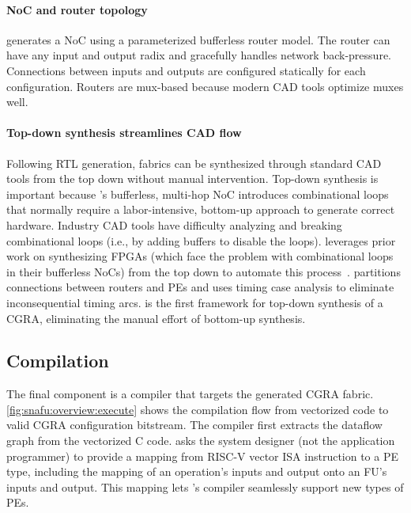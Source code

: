 \paragraph{NoC and router topology}
%
\snafuframe generates a NoC using a parameterized bufferless router model.
% 
The router can have any input and output radix and gracefully handles network back-pressure.
%
Connections between inputs and outputs are configured statically for each configuration.
% 
Routers are mux-based because modern CAD tools optimize muxes well.


\paragraph{Top-down synthesis streamlines CAD flow}
\label{snafu:flexible:topdown}
Following RTL generation, \snafuframe fabrics
can be synthesized through standard CAD tools from the top down without manual intervention.
% 
Top-down synthesis is important because \snafu's bufferless, multi-hop
NoC introduces combinational loops that normally require a
labor-intensive, bottom-up approach to generate correct hardware.
% 
Industry CAD tools have difficulty analyzing and breaking combinational loops
(i.e., by adding buffers to disable the loops).
% 
\snafuframe leverages prior work on synthesizing FPGAs (which face the
problem with combinational loops in their bufferless NoCs) from the top down to
automate this process~\cite{li2020automated,top_down}.
% 
\snafuframe partitions connections between routers and PEs and uses timing case analysis to eliminate inconsequential timing arcs.
% 
\snafuframe is the first framework for top-down
synthesis of a CGRA, eliminating the manual effort of bottom-up synthesis.

\subsection{Compilation}

The final component is a compiler that targets the generated CGRA fabric.
% 
\autoref{fig:snafu:overview:execute} shows the compilation flow from vectorized code to valid CGRA configuration bitstream.
%
The compiler first extracts the dataflow graph from the vectorized C code.
%
\snafuframe asks the system designer (not the application programmer) to
provide a mapping from \mbox{RISC-V} vector ISA instruction to a PE type, including the
mapping of an operation's inputs and output onto an FU's inputs and
output.
% 
This mapping lets \snafu's compiler seamlessly support new types of PEs.

